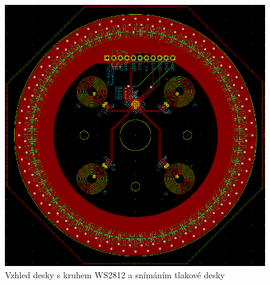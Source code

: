 \begin{figure}
    \centering
    \includegraphics[width=\textwidth]{kapitoly/obrazky/E4/elektronika_tlakove_desky/leddeska-KiCad.png}
    \caption{Vzhled desky s kruhem WS2812 a snímáním tlakové desky}
    \label{fig:E4-LedDeska}
\end{figure}


